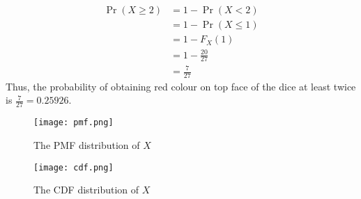 \documentclass[journal,12pt,twocolumn]{IEEEtran}
\begin{document}
\begin{center}
\begin{table}[h]
    \centering
    \caption{CDF of X}
    \label{table 2}
\end{table}
\end{center}
\begin{align}
    \Pr{(X \geq 2)} &= 1 - \Pr{(X < 2)}
    \\&= 1 - \Pr{(X \leq 1)}
    \\&= 1 - F_X(1)
    \\&= 1 - \frac{20}{27}
    \\&= \frac{7}{27}
\end{align}
Thus, the probability of obtaining red colour on top face of the dice at least twice is $\frac{7}{27} = 0.25926$.
\begin{figure} [H]
    \texttt{[image: pmf.png]}
    \caption{The PMF distribution of $X$}
    \label{Fig 1}
\end{figure}
\begin{figure} [H]
    \texttt{[image: cdf.png]}
    \caption{The CDF distribution of $X$}
    \label{Fig 2}
\end{figure}
\end{document}
